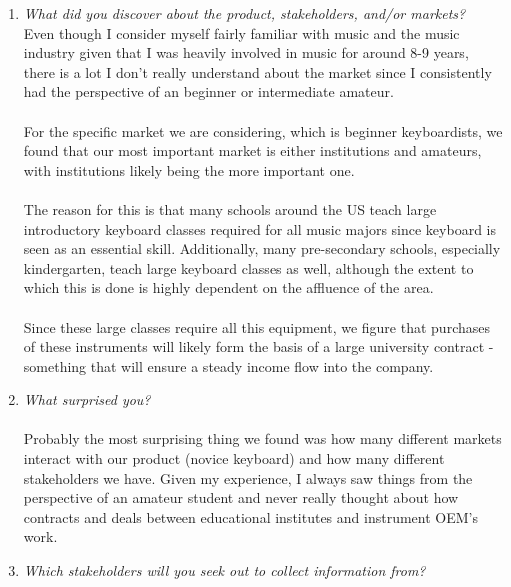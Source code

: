 \documentclass{article}
\begin{document}

\begin{enumerate}
    \item \textit{What did you discover about the product, stakeholders, and/or markets?}
    \\

    Even though I consider myself fairly familiar with music and the music industry given that I was heavily involved in music for around 8-9 years, there is a lot I don't really understand about the market since I consistently had the perspective of an beginner or intermediate amateur. 
    \\
    \\
    For the specific market we are considering, which is beginner keyboardists, we found that our most important market is either institutions and amateurs, with institutions likely being the more important one. 
    \\
    \\
    The reason for this is that many schools around the US teach large introductory keyboard classes required for all music majors since keyboard is seen as an essential skill. Additionally, many pre-secondary schools, especially kindergarten, teach large keyboard classes as well, although the extent to which this is done is highly dependent on the affluence of the area. 
    \\
    \\
    Since these large classes require all this equipment, we figure that purchases of these instruments will likely form the basis of a large university contract - something that will ensure a steady income flow into the company.
    \\
    \item \textit{What surprised you?}
    \\
    \\
    Probably the most surprising thing we found was how many different markets interact with our product (novice keyboard) and how many different stakeholders we have. Given my experience, I always saw things from the perspective of an amateur student and never really thought about how contracts and deals between educational institutes and instrument OEM's work.
    \\
    \item \textit{Which stakeholders will you seek out to collect information from?}

\end{enumerate}
\end{document}
